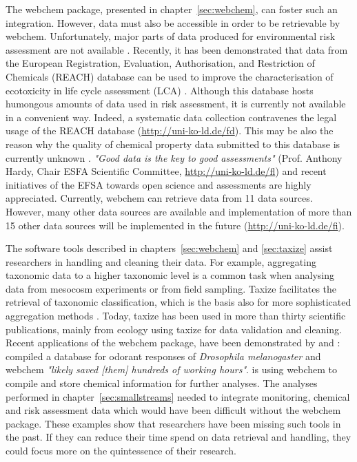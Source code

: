 The webchem package, presented in chapter~\ref{sec:webchem}, can foster such an integration.
However, data must also be accessible in order to be retrievable by webchem. 
Unfortunately, major parts of data produced for environmental risk assessment are not available \citep{schafer_letter_2013, dafforn_big_2015}. 
Recently, it has been demonstrated that data from the European Registration, Evaluation, Authorisation, and Restriction of Chemicals (REACH) database can be used to improve the characterisation of ecotoxicity in life cycle assessment (LCA) \citep{muller_exploring_2016}.
Although this database hosts humongous amounts of data used in risk assessment, it is currently not available in a convenient way.
Indeed, a systematic data collection contravenes the legal usage of the REACH database (\url{http://uni-ko-ld.de/fd}).
This may be also the reason why the quality of chemical property data submitted to this database is currently unknown \citep{stieger_assessing_2014, muller_exploring_2016}. 
\emph{"Good data is the key to good assessments"} (Prof. Anthony Hardy, Chair ESFA Scientific Committee, \url{http://uni-ko-ld.de/fl}) and recent initiatives of the EFSA towards open science and assessments are highly appreciated. 
Currently, webchem can retrieve data from 11 data sources. 
However, many other data sources are available and implementation of more than 15 other data sources will be implemented in the future (\url{http://uni-ko-ld.de/fi}).

The software tools described in chapters~\ref{sec:webchem} and \ref{sec:taxize} assist researchers in handling and cleaning their data. 
For example, aggregating taxonomic data to a higher taxonomic level is a common task when analysing data from mesocosm experiments or from field sampling.
Taxize facilitates the retrieval of taxonomic classification, which is the basis also for more sophisticated aggregation methods \citep{cuffney_ambiguous_2007}. 
Today, taxize has been used in more than thirty scientific publications, mainly from ecology using taxize for data validation and cleaning.
Recent applications of the webchem package, have been demonstrated by \citet{munch_door_2016} and \citet{ranke_chents_2016}: 
\citet{munch_door_2016} compiled a database for odorant responses of \textit{Drosophila melanogaster} and webchem \emph{"likely saved [them] hundreds of working hours"}. 
\citet{ranke_chents_2016} is using webchem to compile and store chemical information for further analyses. 
The analyses performed in chapter~\ref{sec:smallstreams} needed to integrate monitoring, chemical and risk assessment data which would have been difficult without the webchem package. 
These examples show that researchers have been missing such tools in the past.
If they can reduce their time spend on data retrieval and handling, they could focus more on the quintessence of their research. 


